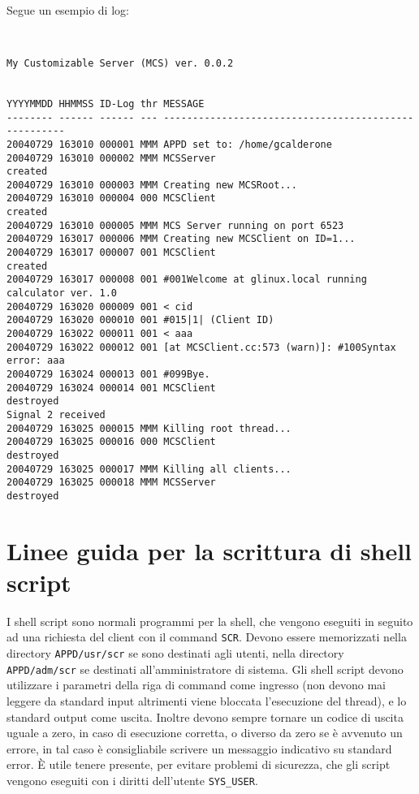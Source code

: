 \bigskip

Segue un esempio di log:
\footnotesize
\begin{verbatim}


My Customizable Server (MCS) ver. 0.0.2


YYYYMMDD HHMMSS ID-Log thr MESSAGE
-------- ------ ------ --- -----------------------------------------------------
20040729 163010 000001 MMM APPD set to: /home/gcalderone
20040729 163010 000002 MMM MCSServer                            created
20040729 163010 000003 MMM Creating new MCSRoot...
20040729 163010 000004 000 MCSClient                            created
20040729 163010 000005 MMM MCS Server running on port 6523
20040729 163017 000006 MMM Creating new MCSClient on ID=1...
20040729 163017 000007 001 MCSClient                            created
20040729 163017 000008 001 #001Welcome at glinux.local running calculator ver. 1.0
20040729 163020 000009 001 < cid
20040729 163020 000010 001 #015|1| (Client ID)
20040729 163022 000011 001 < aaa
20040729 163022 000012 001 [at MCSClient.cc:573 (warn)]: #100Syntax error: aaa
20040729 163024 000013 001 #099Bye.
20040729 163024 000014 001 MCSClient                            destroyed
Signal 2 received
20040729 163025 000015 MMM Killing root thread...
20040729 163025 000016 000 MCSClient                            destroyed
20040729 163025 000017 MMM Killing all clients...
20040729 163025 000018 MMM MCSServer                            destroyed
\end{verbatim}


\section{Linee guida per la scrittura di shell script}
I shell script sono normali programmi per la shell, che vengono
eseguiti in seguito ad una richiesta del client con il command
\verb|SCR|. Devono essere memorizzati nella directory
\verb|APPD/usr/scr| se sono destinati agli utenti, nella directory
\verb|APPD/adm/scr| se destinati all'amministratore di sistema.  Gli
shell script devono utilizzare i parametri della riga di command come
ingresso (non devono mai leggere da standard input altrimenti viene
bloccata l'esecuzione del thread), e lo standard output come
uscita. Inoltre devono sempre tornare un codice di uscita uguale a
zero, in caso di esecuzione corretta, o diverso da zero se \`e
avvenuto un errore, in tal caso \`e consigliabile scrivere un
messaggio indicativo su standard error. \`E utile tenere presente, per
evitare problemi di sicurezza, che gli script vengono eseguiti con i
diritti dell'utente \verb|SYS_USER|.

